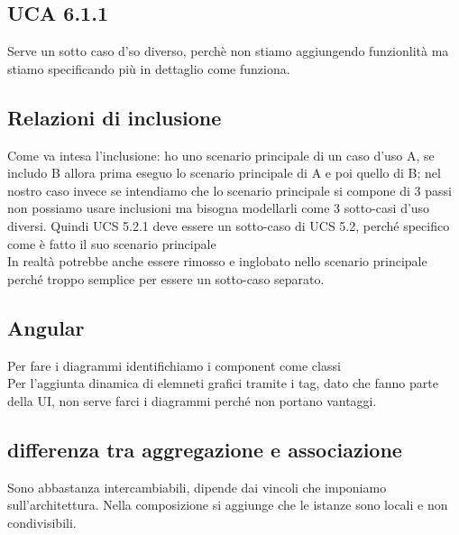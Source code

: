 \subsection{UCA 6.1.1}
Serve un sotto caso d'so diverso, perchè non stiamo aggiungendo funzionlità ma stiamo specificando più in dettaglio come funziona.
\subsection{Relazioni di inclusione}
Come va intesa l'inclusione: ho uno scenario principale di un caso d'uso A, se includo B allora prima eseguo lo scenario principale di A e poi quello di B;
nel nostro caso invece se intendiamo che lo scenario principale si compone di 3 passi non possiamo usare inclusioni ma bisogna modellarli come 3 sotto-casi d'uso diversi.
Quindi UCS 5.2.1 deve essere un sotto-caso di UCS 5.2, perché specifico come è fatto il suo scenario principale\\
In realtà potrebbe anche essere rimosso e inglobato nello scenario principale perché troppo semplice per essere un sotto-caso separato.

\subsection{Angular}
Per fare i diagrammi identifichiamo i component come classi\\
Per l'aggiunta dinamica di elemneti grafici tramite i tag, dato che fanno parte della UI, non serve farci i diagrammi perché non portano vantaggi.
\subsection{differenza tra aggregazione e associazione}
Sono abbastanza intercambiabili, dipende dai vincoli che imponiamo sull'architettura.
Nella composizione si aggiunge che le istanze sono locali e non condivisibili.
 




\clearpage